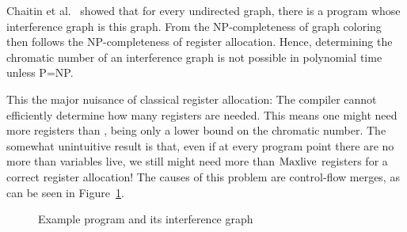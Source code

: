 {Chaitin et al.~\cite{chaitin:1981:register} showed that for every undirected graph, there is a program whose interference graph is this graph.
From the NP-completeness of graph coloring then follows the NP-completeness of register allocation.
Hence, determining the chromatic number of an interference graph is not possible in polynomial time unless P=NP.

This the major nuisance of classical register allocation:
The compiler cannot efficiently determine how many registers are needed.
This means one might need more registers than \maxlive, \maxlive being only a lower bound on the chromatic number.
The somewhat unintuitive result is that, even if at every program point there are no more than \maxlive variables live, we still might need more than $\mathrm{Maxlive}$ registers for a correct register allocation!
The causes of this problem are control-flow merges, %
as can be seen in Figure~\ref{fig:ra:exprg}.

\begin{figure}[htbp]
	\begin{center}
		\qquad
	\end{center}
	\caption{Example program and its interference graph}
	\label{fig:ra:exprg}
\end{figure}

}
